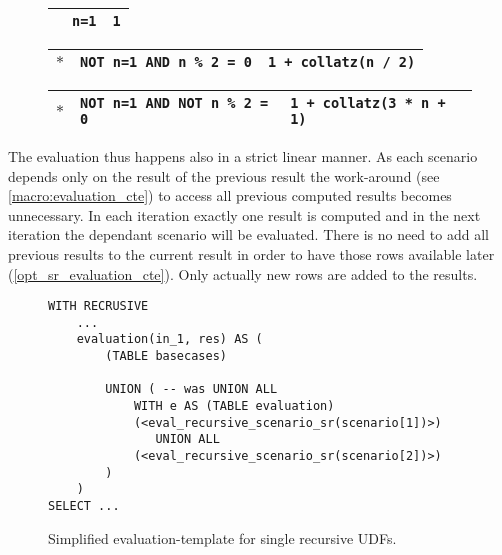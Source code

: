 \begin{figure}[h]
    \centering
    \begin{minipage}[b]{.45\linewidth}
    \centering
    \label{lst:collatz_udf}
    \end{minipage}
    \begin{minipage}[b]{.5\linewidth}
    \centering\scriptsize
        \begin{tabular}{|p{1em}|p{3.3cm}|p{2.9cm}|}\hline
        \cellcolor{gray!25} & \texttt{\phantom{NOT }n=1} & \texttt{1}\\\hline
        \end{tabular}
        
        \begin{tabular}{|p{1em}|p{3.3cm}|p{2.9cm}|}\hline
        \cellcolor{gray!25} $\ast$ & \texttt{NOT n=1 AND \phantom{NOT }n \% 2 = 0} & \texttt{1 + collatz(n / 2)}\\\hline
        \end{tabular}
        
        \begin{tabular}{|p{1em}|p{3.3cm}|p{2.9cm}|}\hline
        \cellcolor{gray!25} $\ast$ & \texttt{NOT n=1 AND NOT n \% 2 = 0} & \texttt{1 + collatz(3 * n + 1)}\\\hline
        \end{tabular}
        \vspace{2em}
    \label{collatz_scenarios}
    \end{minipage}
    \caption{}
    \label{collatz_sql_with_scenarios}
\end{figure}

The evaluation thus happens also in a strict linear manner. As each scenario depends only on the result of the previous result the work-around (see \autoref{macro:evaluation_cte}) to access all previous computed results becomes unnecessary. In each iteration exactly one result is computed and in the next iteration the dependant scenario will be evaluated. There is no need to add all previous results to the current result in order to have those rows available later (\autoref{opt_sr_evaluation_cte}). Only actually new rows are added to the results.

\begin{figure}[h!]
    \centering
    \begin{verbatim}
WITH RECRUSIVE
    ...
    evaluation(in_1, res) AS (
        (TABLE basecases)
        
        UNION ( -- was UNION ALL
            WITH e AS (TABLE evaluation)
            (<eval_recursive_scenario_sr(scenario[1])>)
               UNION ALL
            (<eval_recursive_scenario_sr(scenario[2])>)
        )
    )
SELECT ...
    \end{verbatim}
    \caption{Simplified evaluation-template for single recursive UDFs.}
    \label{opt_sr_evaluation_cte}
\end{figure}

